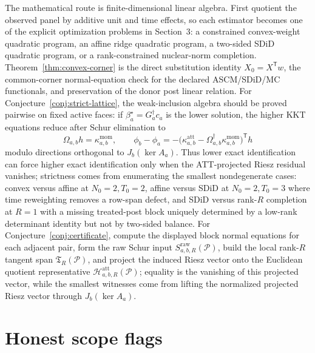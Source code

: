 \documentclass[11pt]{article}
\newcommand{\transpose}{\mathsf{T}}
\newcommand{\calH}{\mathcal{H}}
\theoremstyle{definition}
\theoremstyle{plain}
\theoremstyle{remark}
\begin{document}
The mathematical route is finite-dimensional linear algebra. First quotient the observed panel by additive unit and time effects, so each estimator becomes one of the explicit optimization problems in Section~3: a constrained convex-weight quadratic program, an affine ridge quadratic program, a two-sided SDiD quadratic program, or a rank-constrained nuclear-norm completion. Theorem~\ref{thm:convex-corner} is the direct substitution identity \(X_0=X^\transpose w\), the common-corner normal-equation check for the declared ASCM/SDiD/MC functionals, and preservation of the donor post linear relation. For Conjecture~\ref{conj:strict-lattice}, the weak-inclusion algebra should be proved pairwise on fixed active faces: if \(\beta_a^\star=G_a^\dagger c_a\) is the lower solution, the higher KKT equations reduce after Schur elimination to
\[
\Omega_{a,b}h=\kappa^{\mathrm{mom}}_{a,b},\qquad
\phi_b-\phi_a
=-\bigl(\kappa^{\mathrm{att}}_{a,b}-\Omega_{a,b}^\dagger\kappa^{\mathrm{mom}}_{a,b}\bigr)^\transpose h
\]
modulo directions orthogonal to \(J_b(\ker A_a)\). Thus lower exact identification can force higher exact identification only when the ATT-projected Riesz residual vanishes; strictness comes from enumerating the smallest nondegenerate cases: convex versus affine at \(N_0=2,T_0=2\), affine versus SDiD at \(N_0=2,T_0=3\) where time reweighting removes a row-span defect, and SDiD versus rank-\(R\) completion at \(R=1\) with a missing treated-post block uniquely determined by a low-rank determinant identity but not by two-sided balance. For Conjecture~\ref{conj:certificate}, compute the displayed block normal equations for each adjacent pair, form the raw Schur input \(S^{\mathrm{raw}}_{a,b,R}(\mathcal P)\), build the local rank-\(R\) tangent span \(\mathfrak T_R(\mathcal P)\), and project the induced Riesz vector onto the Euclidean quotient representative \(\calH^{\mathrm{att}}_{a,b,R}(\mathcal P)\); equality is the vanishing of this projected vector, while the smallest witnesses come from lifting the normalized projected Riesz vector through \(J_b(\ker A_a)\).

\section{Honest scope flags}
\end{document}
